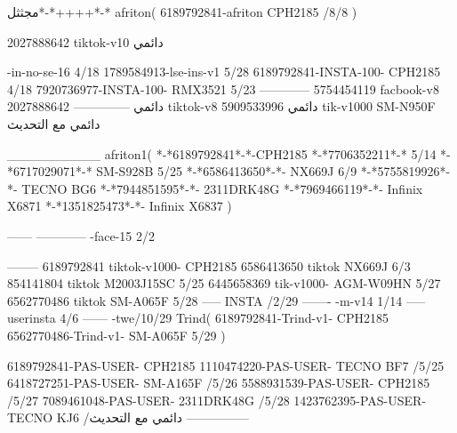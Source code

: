 مجثثل*-*++++*-*
afriton(
6189792841-afriton CPH2185  /8/8
)

2027888642 tiktok-v10
دائمي

-in-no-se-16 4/18
1789584913-lse-ins-v1 5/28
6189792841-INSTA-100- CPH2185 4/18
7920736977-INSTA-100- RMX3521 5/23
------------
5754454119 facbook-v8
دائمي
--------------
2027888642 tiktok-v8
دائمي
5909533996 tik-v1000  SM-N950F
دائمي مع التحديث

__________
afriton1(
*-*6189792841*-*-CPH2185
*-*7706352211*-* 5/14
*-*6717029071*-*  SM-S928B 5/25
*-*6586413650*-*- NX669J  6/9
*-*5755819926*-*-   TECNO BG6  \5
*-*7944851595*-*-   2311DRK48G  \5
*-*7969466119*-*-   Infinix X6871  \5
*-*1351825473*-*-   Infinix X6837  \5
)


------
------------
-face-15 2/2

--------
6189792841 tiktok-v1000- CPH2185 
6586413650 tiktok NX669J  6/3
854141804 tiktok M2003J15SC   5/25
6445658369 tik-v1000- AGM-W09HN  5/27
6562770486 tiktok  SM-A065F   5/28
-----
 INSTA /2/29
-------
-m-v14 1/14
-----
userinsta 4/6
------
-twe/10/29
Trind(
6189792841-Trind-v1- CPH2185 
6562770486-Trind-v1- SM-A065F   5/29
)

6189792841-PAS-USER- CPH2185 
1110474220-PAS-USER-  TECNO BF7  /5/25
6418727251-PAS-USER-  SM-A165F  /5/26
5588931539-PAS-USER-  CPH2185  /5/27
7089461048-PAS-USER-  2311DRK48G  /5/28
1423762395-PAS-USER- TECNO KJ6  /دائمي مع التحديث
    ---------------
